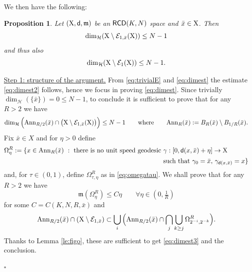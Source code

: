 \documentclass[reqno,11pt]{article}
\numberwithin{equation}{section}
\newcommand{\mm}{{\mbox{\boldmath$m$}}}
\newcommand{\sfd}{{\sf d}}
\renewcommand{\mm}{\mathfrak m}                                %
\renewenvironment{proof}{\removelastskip\par\medskip   %
\noindent{\em Proof} \rm}{\penalty-20\null\hfill$\square$\par\medbreak}
\newtheorem{proposition}[theorem]{Proposition}
\newcommand{\X}{{\rm X}}
\newcommand{\RCD}{{\sf RCD}}
\newcommand{\HH}{{\mathcal H}}
\begin{document}
We then have the following:
\begin{proposition}\label{le:nm1}
Let $(\X,\sfd,\mm)$ be an $\RCD(K,N)$ space and $\bar x\in \X$. Then
\begin{equation}
\label{eq:dimest}
\dim_\HH(\X\setminus \mathcal E_{1,\bar x}(\X))\leq N-1
\end{equation}
and thus also
\begin{equation}
\label{eq:dimest2}
\dim_\HH(\X\setminus \mathcal E_{1}(\X))\leq N-1.
\end{equation}
\end{proposition}
\begin{proof}

\noindent\underline{Step 1: structure of the argument.} From \eqref{eq:trivialE} and \eqref{eq:dimest} the estimate \eqref{eq:dimest2} follows, hence we focus in proving \eqref{eq:dimest}. Since trivially $\dim_\HH(\{\bar x\})=0\leq N-1$, to conclude it is sufficient to prove that for any $R>2$ we have 
\begin{equation}
\label{eq:dimest3}
\dim_\HH\Big({\rm Ann}_{R/2}(\bar x)\cap \big(\X\setminus \mathcal E_{1,\bar x}(\X)\big)\Big)\leq N-1\qquad\text{where}\qquad {\rm Ann}_R(\bar x):=B_R(\bar x)\setminus B_{1/R}(\bar x).
\end{equation}
Fix $\bar x\in X$ and for $\eta>0$ define
\[
\begin{split}
\Omega^R_\eta:=\{x\in{\rm Ann}_{R}(\bar x)\ :\  \text{there is no unit speed geodesic } & \gamma:[0,\sfd(x,\bar x)+\eta]\to \X\\
&\text{such that $\gamma_0=\bar x$, $\gamma_{\sfd(x,\bar x)}=x$}\}
\end{split}
\]
and, for $\tau\in(0,1)$, define $\Omega^R_{\tau,\eta}$ as in \eqref{eq:omegatau}. We shall prove that for any $R>2$ we have
\begin{equation}
\label{eq:1}
\mm(\Omega^R_\eta)\leq  C\eta \qquad\forall \eta\in(0,\tfrac{1}{R})
\end{equation}
for some $C=C(K,N,R,\bar x)$ and
\begin{equation}
\label{eq:2}
{\rm Ann}_{R/2}(\bar x)\cap(\X\setminus\mathcal E_{1,\bar x})\subset\bigcup_{i}\Big( {\rm Ann}_{R/2}(\bar x)\cap  \bigcap_j\bigcup_{k\geq j}\Omega^R_{2^{-i},2^{-k}}\Big).
\end{equation}
Thanks to Lemma \ref{le:figo}, these are sufficient to get \eqref{eq:dimest3} and the conclusion.


\end{proof}
\end{document}
